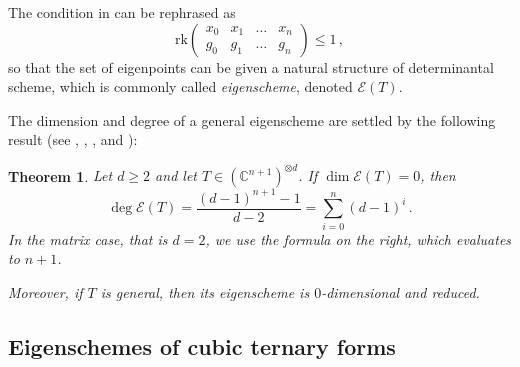 \documentclass[a4paper, 11pt, reqno]{amsart}
\theoremstyle{plain}
\newtheorem{theoremintro}{Theorem}
\theoremstyle{definition}
\newcommand{\C}{\mathbb{C}}
\newcommand{\rk}{\ensuremath{\mathrm{rk}}}
\newcommand{\Eig}[1]{\mathcal{E}\!\left( {#1} \right)}
\begin{document}
The condition in  can be rephrased as
%
\begin{equation}
\label{eq:def_matrix_general}
  \rk
  \begin{pmatrix}
    x_0 & x_1 & \dots & x_n \\
    g_0 & g_1 & \dots & g_n
  \end{pmatrix} \le 1 \,,
\end{equation}
%
so that the set of eigenpoints can be given a natural structure of determinantal scheme, which is commonly called \emph{eigenscheme}, denoted $\Eig{T}$.

The dimension and degree of a general eigenscheme are settled by the following result (see \cite[Theorem 2.1]{CartSturm}, \cite{ASS}, \cite{OO}, and \cite[Equation~5.2]{Abo}):

\begin{theoremintro}
\label{thm:nonempty}
Let $d \ge 2$ and let $T \in (\C^{n+1})^{\otimes d}$.
If $\dim \Eig{T}=0$, then 
%
\[
  \deg \Eig{T} =
  \frac{(d-1)^{n+1}-1}{d-2} =
  \sum_{i=0}^{n} (d-1)^i \,.
\]
%
In the matrix case, that is $d = 2$, we use the formula on the right, which evaluates to $n+1$.

Moreover, if $T$ is general, then its eigenscheme is $0$-dimensional and reduced.
\end{theoremintro}

\subsection*{Eigenschemes of cubic ternary forms}
\end{document}
